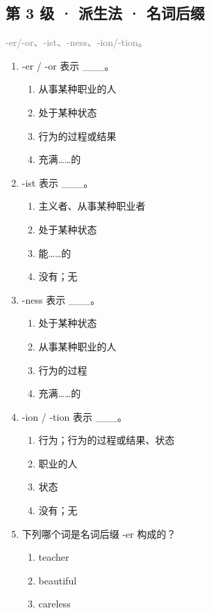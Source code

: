 \documentclass[11pt,a4paper]{ctexart}
\begin{document}
\subsection*{第 3 级 · 派生法 · 名词后缀}
\noindent\textcolor{gray}{-er/-or、-ist、-ness、-ion/-tion。}\par\smallskip
\begin{enumerate}[leftmargin=*,itemsep=4pt]
\item -er / -or 表示 \_\_\_。
\begin{enumerate}[label=\Alph*.,leftmargin=2em,itemsep=1pt,topsep=2pt]
\item 从事某种职业的人
\item 处于某种状态
\item 行为的过程或结果
\item 充满……的
\end{enumerate}
\item -ist 表示 \_\_\_。
\begin{enumerate}[label=\Alph*.,leftmargin=2em,itemsep=1pt,topsep=2pt]
\item 主义者、从事某种职业者
\item 处于某种状态
\item 能……的
\item 没有；无
\end{enumerate}
\item -ness 表示 \_\_\_。
\begin{enumerate}[label=\Alph*.,leftmargin=2em,itemsep=1pt,topsep=2pt]
\item 处于某种状态
\item 从事某种职业的人
\item 行为的过程
\item 充满……的
\end{enumerate}
\item -ion / -tion 表示 \_\_\_。
\begin{enumerate}[label=\Alph*.,leftmargin=2em,itemsep=1pt,topsep=2pt]
\item 行为；行为的过程或结果、状态
\item 职业的人
\item 状态
\item 没有；无
\end{enumerate}
\item 下列哪个词是名词后缀 -er 构成的？
\begin{enumerate}[label=\Alph*.,leftmargin=2em,itemsep=1pt,topsep=2pt]
\item teacher
\item beautiful
\item careless

\end{enumerate}
\end{enumerate}
\end{document}
